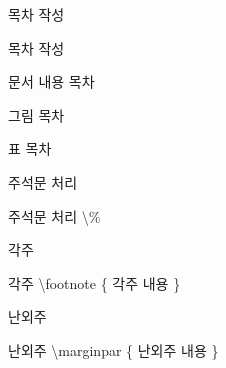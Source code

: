 \documentclass[10pt,xcolor=pdftex,dvipsnames,table,handout]{beamer}
\begin{document}
		\begin{frame}[t]{목차 작성}

			\begin{block} {목차 작성}
			\begin{description}[12345678901234567]
			\item [\textbackslash table of contents] 	문서 내용 목차
			\item [\textbackslash list of figures]		그림 목차
			\item [\textbackslash list of tables] 		표 목차
			\end{description}
			\end{block}



		\end{frame}




		\begin{frame}[t]{주석문 처리}

			\begin{block} {주석문 처리}
			\textbackslash \%
			\end{block}

		\end{frame}



		\begin{frame}[t]{각주}

			\begin{block} {각주}
			\textbackslash footnote \{ 각주 내용 \}
			\end{block}


		\end{frame}




		\begin{frame}[t]{난외주}

			\begin{block} {난외주}
			\textbackslash marginpar \{ 난외주 내용 \}
			\end{block}

		\end{frame}
\end{document}
